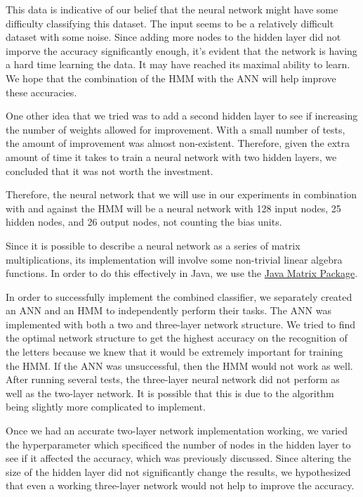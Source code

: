 \documentclass[11pt,letterpaper]{article}
\begin{document}
This data is indicative of our belief that the neural network might have some
difficulty classifying this dataset. The input seems to be a relatively
difficult dataset with some noise. Since adding more nodes to the hidden layer
did not imporve the accuracy significantly enough, it's evident that the
network is having a hard time learning the data. It may have reached its
maximal ability to learn. We hope that the combination of the HMM with the ANN
will help improve these accuracies.

One other idea that we tried was to add a second hidden layer to see if
increasing the number of weights allowed for improvement. With a small number
of tests, the amount of improvement was almost non-existent. Therefore, given
the extra amount of time it takes to train a neural network with two hidden
layers, we concluded that it was not worth the investment.

Therefore, the neural network that we will use in our experiments in
combination with and against the HMM will be a neural network with 128 input
nodes, 25 hidden nodes, and 26 output nodes, not counting the bias units.

Since it is possible to describe a neural network as a series of matrix multiplications, its
implementation will involve some non-trivial linear algebra functions. In order to do this
effectively in Java, we use the \href{http://math.nist.gov/javanumerics/jama/}{Java Matrix Package}.

In order to successfully implement the combined classifier, we separately
created an ANN and an HMM to independently perform their tasks. The ANN was
implemented with both a two and three-layer network structure. We tried to
find the optimal network structure to get the highest accuracy on the
recognition of the letters because we knew that it would be extremely important
for training the HMM\@. If the ANN was unsuccessful, then the HMM would not work
as well. After running several tests, the three-layer neural network did not
perform as well as the two-layer network. It is possible that this is due to
the algorithm being slightly more complicated to implement.

Once we had an accurate two-layer network implementation working, we varied the
hyperparameter which specificed the number of nodes in the hidden layer to see
if it affected the accuracy, which was previously discussed. Since altering the
size of the hidden layer did not significantly change the results, we
hypothesized that even a working three-layer network would not help to improve
the accuracy.
\end{document}
